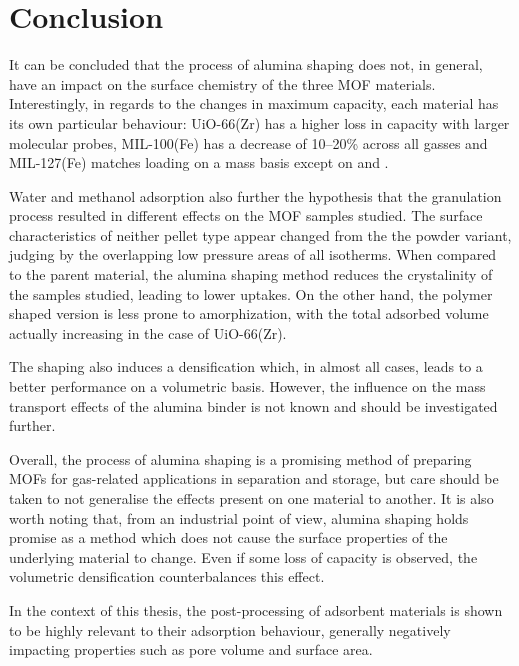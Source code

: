 
\FloatBarrier%

\section{Conclusion}

It can be concluded that the process of alumina shaping does not, in 
general, have an impact on the surface chemistry of the three MOF
materials. Interestingly, in regards to the changes in maximum capacity,
each material has its own particular behaviour: UiO-66(Zr) has a 
higher loss in capacity with larger molecular probes, MIL-100(Fe) 
has a decrease of 10--20\% across all gasses and MIL-127(Fe) matches
loading on a mass basis except on  and .

Water and methanol adsorption also further the hypothesis that 
the granulation process resulted in different
effects on the MOF samples studied. The surface 
characteristics of neither pellet type appear changed from the 
the powder variant, judging by the overlapping low pressure
areas of all isotherms. When compared to the parent material,
the alumina shaping method reduces 
the crystalinity of the samples studied, leading to lower uptakes.
On the other hand, the polymer shaped version is less prone to
amorphization, with the total adsorbed volume actually increasing
in the case of UiO-66(Zr).

The shaping also induces a densification which, in almost all cases,
leads to a better performance on a volumetric basis. However, the 
influence on the mass transport effects of the alumina binder is 
not known and should be investigated further. 

Overall, the process of alumina shaping is a promising method of 
preparing MOFs for gas-related applications in separation and 
storage, but care should be taken to not generalise the effects
present on one material to another. It is also worth noting that,
from an industrial point of view, alumina shaping holds promise 
as a method which does not cause the surface properties of 
the underlying material to change. Even if some loss of capacity
is observed, the volumetric densification counterbalances this effect. 

In the context of this thesis, the post-processing of adsorbent
materials is shown to be highly relevant to their adsorption behaviour,
generally negatively impacting properties such as pore volume and surface
area. 

\pagebreak
